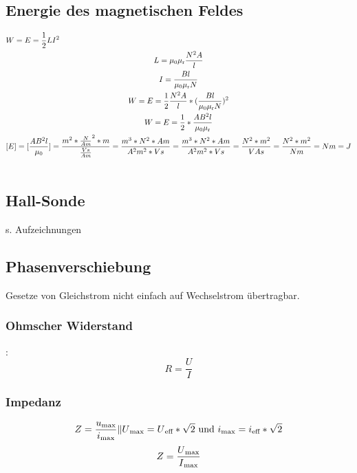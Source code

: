 \documentclass{scrartcl}
\begin{document}
        \subsection*{Energie des magnetischen Feldes}
            \begin{equation}
                \begin{multlined}
                    W = E = \frac{1}{2}LI^2 \\
                    L = \mu\textsubscript{0}\mu\textsubscript{r}\frac{N^2A}{l} \\
                    I = \frac{Bl}{\mu\textsubscript{0}\mu\textsubscript{r}N} \\
                    W = E = \frac{1}{2}\frac{N^2A}{l}*(\frac{Bl}{\mu\textsubscript{0}\mu\textsubscript{r}N})^2 \\
                    W = E = \frac{1}{2}*\frac{AB^2l}{\mu\textsubscript{0}\mu\textsubscript{r}} \\
                    [E] = [\frac{AB^2l}{\mu\textsubscript{0}}] = \frac{m^2*\frac{N}{Am}^2*m}{\frac{Vs}{Am}} = \frac{m^3*N^2*Am}{A^2m^2*Vs} = \frac{m^3*N^2*Am}{A^2m^2*Vs} = \frac{N^2*m^2}{VAs} = \frac{N^2*m^2}{Nm}=Nm=J \\
                \end{multlined}
            \end{equation}
            \subsection*{Hall-Sonde}
                s. Aufzeichnungen
            \subsection*{Phasenverschiebung}
            Gesetze von Gleichstrom nicht einfach auf Wechselstrom übertragbar.
                \subsubsection*{Ohmscher Widerstand}:
                \begin{equation}
                    R = \frac{U}{I}
                \end{equation}
                \subsubsection{Impedanz}
                \begin{equation}
                    Z= \frac{u\textsubscript{$\max$}}{i\textsubscript{$\max$}}\| U\textsubscript{$\max$}=U\textsubscript{eff}*\sqrt{2} \text{ und } i\textsubscript{$\max$}=i\textsubscript{eff}*\sqrt{2}
                \end{equation}
                \begin{equation}
                    Z= \frac{U\textsubscript{$\max$}}{I\textsubscript{$\max$}}
                \end{equation}
\end{document}
